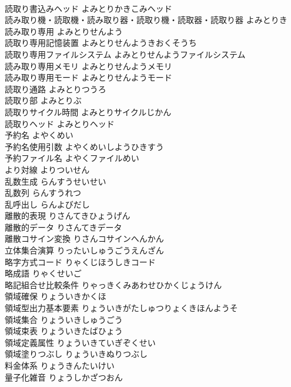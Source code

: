 \documentclass[8pt]{extreport}
\begin{document}
\begin{CJK}{UTF8}{min}
\\	読取り書込みヘッド	よみとりかきこみヘッド	
\\	読み取り機・読取機・読み取り器・読取り機・読取器・読取り器	よみとりき	
\\	読み取り専用	よみとりせんよう	
\\	読取り専用記憶装置	よみとりせんようきおくそうち	
\\	読取り専用ファイルシステム	よみとりせんようファイルシステム	
\\	読み取り専用メモリ	よみとりせんようメモリ	
\\	読み取り専用モード	よみとりせんようモード	
\\	読取り通路	よみとりつうろ	
\\	読取り部	よみとりぶ	
\\	読取りサイクル時間	よみとりサイクルじかん	
\\	読取りヘッド	よみとりヘッド	
\\	予約名	よやくめい	
\\	予約名使用引数	よやくめいしようひきすう	
\\	予約ファイル名	よやくファイルめい	
\\	より対線	よりついせん	
\\	乱数生成	らんすうせいせい	
\\	乱数列	らんすうれつ	
\\	乱呼出し	らんよびだし	
\\	離散的表現	りさんてきひょうげん	
\\	離散的データ	りさんてきデータ	
\\	離散コサイン変換	りさんコサインへんかん	
\\	立体集合演算	りったいしゅうごうえんざん	
\\	略字方式コード	りゃくじほうしきコード	
\\	略成語	りゃくせいご	
\\	略記組合せ比較条件	りゃっきくみあわせひかくじょうけん	
\\	領域確保	りょういきかくほ	
\\	領域型出力基本要素	りょういきがたしゅつりょくきほんようそ	
\\	領域集合	りょういきしゅうごう	
\\	領域束表	りょういきたばひょう	
\\	領域定義属性	りょういきていぎぞくせい	
\\	領域塗りつぶし	りょういきぬりつぶし	
\\	料金体系	りょうきんたいけい	
\\	量子化雑音	りょうしかざつおん	

\end{CJK}
\end{document}
